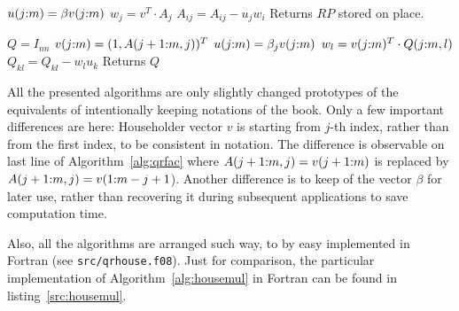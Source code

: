 \begin{refsection}
\begin{algorithm}
  \caption{Householder matrix multiplication}
  \label{alg:housemul}
  \begin{algorithmic}
    \State {}
    \State {}
    \State $u(j{:}m) = \beta v(j{:}m)$
    \State $w_j = v^T \cdot A_j$
    \EndFor
    \State $A_{ij} = A_{ij} - u_j w_i$
    \EndFor
    \State Returns $RP$ stored on place.
    \EndFunction
  \end{algorithmic}
\end{algorithm}


\begin{algorithm}
  \caption{Evaluate $Q$ from $v$ stored under diagonal of $R$}
  \label{alg:qform}
  \begin{algorithmic}
    \State {}
    \State {}
    \State $Q = I_{nn}$
    \State $v(j{:}m) = (1, A(j+1{:}m,j))^T$
    \State $u(j{:}m) = \beta_j v(j{:}m)$
    \State $w_l = v(j{:}m)^T \cdot Q(j{:}m,l)$
    \EndFor
    \State $Q_{kl} = Q_{kl} - w_l u_k$
    \EndFor
    \EndFor
    \State Returns $Q$
    \EndFunction
  \end{algorithmic}
\end{algorithm}

All the presented algorithms are only slightly changed prototypes of
the equivalents of \cite{golub2013matrix} intentionally
keeping notations of the book.
Only a few important differences are here:
Householder vector $v$ is starting from $j$-th index, rather than
from the first index, to be consistent in notation.
The difference is observable on last line of
Algorithm~\ref{alg:qrfac} where $A(j+1{:}m,j) = v(j+1{:}m)$
is replaced by $A(j+1{:}m,j) = v(1{:}m-j+1$).
Another difference is to keep of the vector $\beta$ for later use,
rather than recovering it during subsequent applications
to save computation time.

Also, all the
algorithms are arranged such way, to by easy implemented
in Fortran (see \texttt{src/qrhouse.f08}). Just for comparison,
the particular implementation of Algorithm~\ref{alg:housemul}
in Fortran can be found in listing~\ref{src:housemul}.


\end{refsection}
